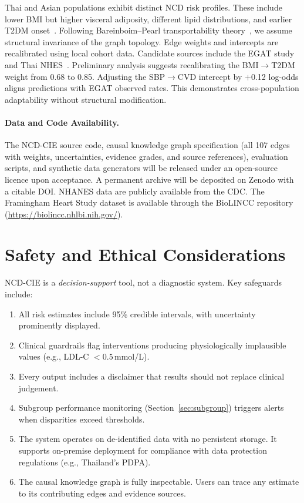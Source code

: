 \documentclass[runningheads]{llncs}
\begin{document}
Thai and Asian populations exhibit distinct NCD risk profiles.
These include lower BMI but higher visceral adiposity, different lipid
distributions, and earlier T2DM
onset~\cite{aekplakorn2011thai}.
Following Bareinboim--Pearl transportability
theory~\cite{bareinboim2016causal}, we assume structural invariance
of the graph topology.
Edge weights and intercepts are recalibrated using local cohort data.
Candidate sources include the EGAT
study~\cite{sritara2003egat} and Thai NHES~\cite{aekplakorn2011thai}.
Preliminary analysis suggests recalibrating the BMI$\rightarrow$T2DM
weight from 0.68 to 0.85.
Adjusting the SBP$\rightarrow$CVD intercept by $+$0.12 log-odds
aligns predictions with EGAT observed rates.
This demonstrates cross-population adaptability without structural
modification.

\paragraph{Data and Code Availability.}
The NCD-CIE source code, causal knowledge graph specification
(all 107 edges with weights, uncertainties, evidence grades, and
source references), evaluation scripts, and synthetic data generators
will be released under an open-source licence upon acceptance.
A permanent archive will be deposited on Zenodo with a citable DOI\@.
NHANES data are publicly available from the CDC\@.
The Framingham Heart Study dataset is available through the BioLINCC
repository (\url{https://biolincc.nhlbi.nih.gov/}).

\section{Safety and Ethical Considerations}\label{sec:ethics}

NCD-CIE is a \emph{decision-support} tool, not a diagnostic system.
Key safeguards include:
\begin{enumerate}
\item All risk estimates include 95\% credible intervals, with
  uncertainty prominently displayed.
\item Clinical guardrails flag interventions producing physiologically
  implausible values (e.g., LDL-C $< 0.5$\,mmol/L).
\item Every output includes a disclaimer that results should not
  replace clinical judgement.
\item Subgroup performance monitoring (Section~\ref{sec:subgroup})
  triggers alerts when disparities exceed thresholds.
\item The system operates on de-identified data with no persistent
  storage.
  It supports on-premise deployment for compliance with data
  protection regulations (e.g., Thailand's PDPA).
\item The causal knowledge graph is fully inspectable.
  Users can trace any estimate to its contributing edges and evidence
  sources.
\end{enumerate}
\end{document}
